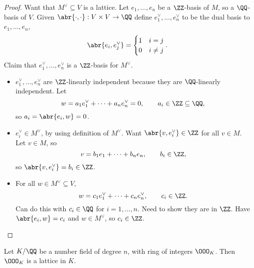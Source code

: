 \pagebreak

\begin{proof}
Want that $ M^\vee \subseteq V $ is a lattice. Let $ e_1, \dots, e_n $ be a $ \ZZ $-basis of $ M $, so a $ \QQ $-basis of $ V $. Given $ \abr{\cdot, \cdot} : V \times V \to \QQ $ define $ e_1^\vee, \dots, e_n^\vee $ to be the dual basis to $ e_1, \dots, e_n $,
$$ \abr{e_i, e_j^\vee} =
\begin{cases}
1 & i = j \\
0 & i \ne j
\end{cases}.
$$
Claim that $ e_1^\vee, \dots, e_n^\vee $ is a $ \ZZ $-basis for $ M^\vee $.
\begin{itemize}
\item $ e_1^\vee, \dots, e_n^\vee $ are $ \ZZ $-linearly independent because they are $ \QQ $-linearly independent. Let
$$ w = a_1e_1^\vee + \dots + a_ne_n^\vee = 0, \qquad a_i \in \ZZ \subseteq \QQ, $$
so $ a_i = \abr{e_i, w} = 0 $.
\item $ e_i^\vee \in M^\vee $, by using definition of $ M^\vee $. Want $ \abr{v, e_i^\vee} \in \ZZ $ for all $ v \in M $. Let $ v \in M $, so
$$ v = b_1e_1 + \dots + b_ne_n, \qquad b_i \in \ZZ, $$
so $ \abr{v, e_i^\vee} = b_i \in \ZZ $.
\item For all $ w \in M^\vee \subseteq V $,
$$ w = c_1e_1^\vee + \dots + c_ne_n^\vee, \qquad c_i \in \ZZ. $$
Can do this with $ c_i \in \QQ $ for $ i = 1, \dots, n $. Need to show they are in $ \ZZ $. Have $ \abr{e_i, w} = c_i $ and $ w \in M^\vee $, so $ c_i \in \ZZ $.
\end{itemize}
\end{proof}

\begin{theorem}
Let $ K / \QQ $ be a number field of degree $ n $, with ring of integers $ \OOO_K $. Then $ \OOO_K $ is a lattice in $ K $.
\end{theorem}

